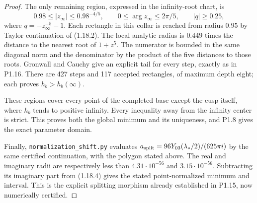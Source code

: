 \begin{proof}
The only remaining region, expressed in the infinity-root chart, is
\[
 0.98\leq |z_\infty|\leq0.98^{-4/5},\qquad
 0\leq\arg z_\infty\leq2\pi/5,
 \qquad |q|\geq0.25,
\]
where $q=-z_\infty^{-5}-1$.
Each rectangle in this collar is reached from radius $0.95$ by
Taylor continuation of (1.18.2).  The local analytic radius is
$0.449$ times the distance to the nearest root of $1+z^5$.
The numerator is bounded in the same diagonal norm and the
denominator by the product of the five distances to those roots.
Gronwall and Cauchy give an explicit tail for every step, exactly
as in P1.16.  There are 427 steps and 117 accepted rectangles,
of maximum depth eight; each proves $h_b>h_b(\infty)$.

These regions cover every point of the completed base except the
cusp itself, where $h_b$ tends to positive infinity.  Every inequality
away from the infinity center is strict.  This proves both the
global minimum and its uniqueness, and P1.8 gives the exact parameter
domain.

Finally, \texttt{normalization\_shift.py} evaluates
$a_{\rm split}=96Y_{03}(\lambda_*/2)/(625\pi i)$ by the same
certified continuation, with the polygon stated above.
The real and imaginary radii are respectively less than
$4.31\cdot10^{-56}$ and $3.15\cdot10^{-56}$.
Subtracting its imaginary part from (1.18.4) gives the stated
point-normalized minimum and interval.  This is the explicit
splitting morphism already established in P1.15, now numerically
certified.
\end{proof}

